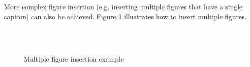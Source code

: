\documentclass[10pt]{report}  %
\begin{document}
More complex figure insertion (e.g. inserting multiple figures that have a single caption) can also be achieved. Figure \ref{fig:testedShapes} illustrates how to insert multiple figures.

\begin{figure}[htp]
  \begin{center}
    \\
    \\
 \end{center}
  \caption{Multiple figure insertion example}
  \label{fig:testedShapes}
\end{figure}
\end{document}

